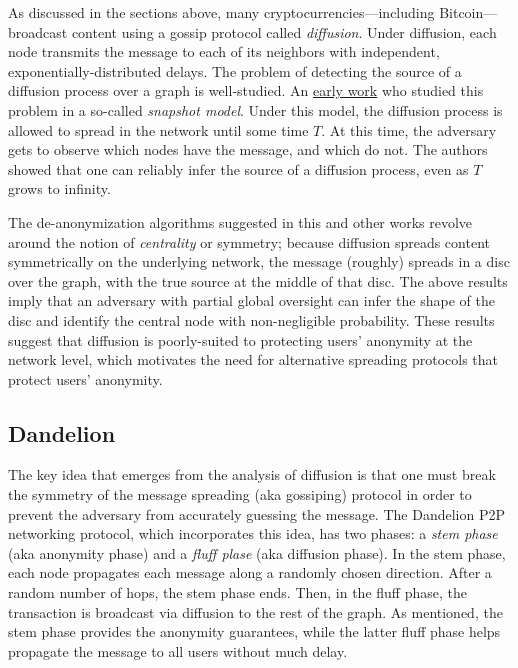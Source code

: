 \documentclass{article}
\begin{document}
As discussed in the sections above, many cryptocurrencies---including Bitcoin---broadcast content using a gossip protocol called \emph{diffusion}. Under diffusion, each node transmits the message to each of its neighbors with independent, exponentially-distributed delays. The problem of detecting the source of a diffusion process over a graph is well-studied. An \href{https://ieeexplore.ieee.org/abstract/document/5961801}{early work}  who studied this problem in a so-called \emph{snapshot model}. Under this model, the diffusion process is allowed to spread in the network until some time $T$. At this time, the adversary gets to observe which nodes have the message, and which do not. The authors showed that one can reliably infer the source of a diffusion process, even as $T$ grows to infinity.

The de-anonymization algorithms suggested in this and other works revolve around the notion of \textit{centrality} or symmetry; because diffusion spreads content symmetrically on the underlying network, the message (roughly) spreads in a disc over the graph, with the true source at the middle of that disc. The above results imply that an adversary with partial global oversight can infer the shape of the disc and identify the central node with non-negligible probability. These results suggest that diffusion is poorly-suited to protecting users' anonymity at the network level, which motivates the need for alternative spreading protocols that protect users' anonymity.

\subsection*{Dandelion}
The key idea that emerges from the analysis of diffusion is that one must break the symmetry of the message spreading (aka gossiping) protocol in order to prevent the adversary from accurately guessing the message.  The {\sf Dandelion} P2P networking protocol, which incorporates this idea, has two phases: a \textit{stem phase} (aka anonymity phase) and a \textit{fluff plase} (aka diffusion phase). In the stem phase, each node propagates each message along a randomly chosen direction. After a random number of hops, the stem phase ends. Then, in the fluff phase, the transaction is broadcast via diffusion to the rest of the graph. As mentioned, the stem phase provides the anonymity guarantees, while the latter fluff phase helps propagate the message to all users without much delay.
\end{document}

